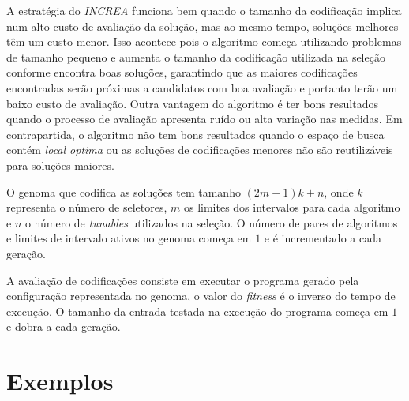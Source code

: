 \documentclass[a4paper, 11pt, twoside]{article}
\begin{document}
A estratégia do \emph{INCREA} funciona bem quando o tamanho da codificação
implica num alto custo de avaliação da solução, mas ao mesmo tempo, soluções
melhores têm um custo menor. Isso acontece pois o algoritmo começa utilizando
problemas de tamanho pequeno e aumenta o tamanho da codificação utilizada na 
seleção conforme encontra boas soluções, garantindo que as maiores codificações
encontradas serão próximas a candidatos com boa avaliação e portanto terão um
baixo custo de avaliação. Outra vantagem do algoritmo é ter bons resultados
quando o processo de avaliação apresenta ruído ou alta variação nas medidas.
Em contrapartida, o algoritmo não tem bons resultados quando o espaço de busca
contém \emph{local optima} ou as soluções de codificações menores não são
reutilizáveis para soluções maiores.

O genoma que codifica as soluções tem tamanho $(2m + 1)k + n$,
onde $k$ representa o número de seletores, $m$ os limites dos intervalos para 
cada algoritmo e $n$ o número de \emph{tunables} utilizados na seleção. O
número de pares de algoritmos e limites de intervalo ativos no genoma começa
em $1$ e é incrementado a cada geração.

A avaliação de codificações consiste em executar o programa gerado pela
configuração representada no genoma, o valor do \emph{fitness} é o inverso
do tempo de execução. O tamanho da entrada testada na execução do programa
começa em $1$ e dobra a cada geração.

\section{Exemplos}

\newpage


\end{document}
